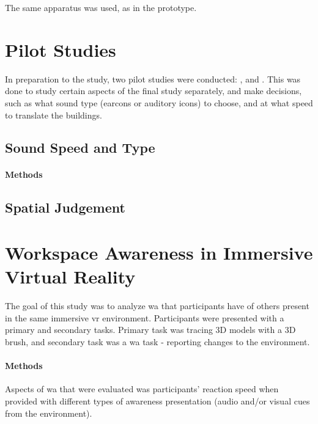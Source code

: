The same apparatus was used, as in the  prototype.


\section{Pilot Studies}
In preparation to the  study, two pilot studies were conducted: , and . This was done to study certain aspects of the final study separately, and make decisions, such as what sound type (earcons or auditory icons) to choose, and at what speed to translate the buildings.

\subsection{Sound Speed and Type}
\label{study_one}

\paragraph{Methods}






\subsection{Spatial Judgement}
\label{study_two}
\section{Workspace Awareness in Immersive Virtual Reality}
\label{final_study}
The goal of this study was to analyze \gls{wa} that participants have of others present in the same immersive \gls{vr} environment. Participants were presented with a primary and secondary tasks. Primary task was tracing 3D models with a 3D brush, and secondary task was a \gls{wa} task - reporting changes to the environment.

\paragraph{Methods}
Aspects of \gls{wa} that were evaluated was participants’ reaction speed when provided with different types of awareness presentation (audio and/or visual cues from the environment).

